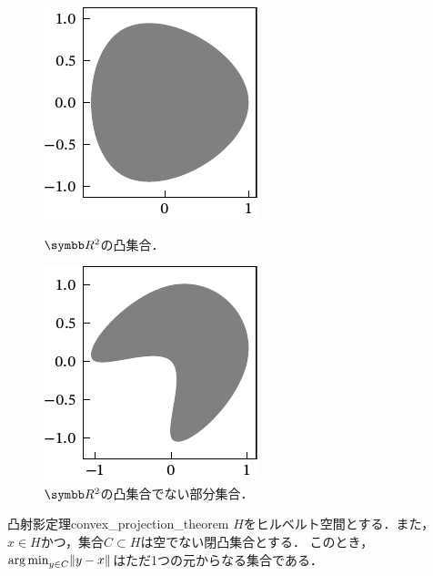 \documentclass[../../main]{subfiles}
\begin{document}
\begin{figure}[htbp]
  \begin{minipage}{0.5\linewidth}
    \centering
    \includegraphics{figures/convex.pdf}
    \caption{\(\numset{R}^2\)の凸集合．}
  \end{minipage}%
  \begin{minipage}{0.5\linewidth}
    \centering
    \includegraphics{figures/non_convex.pdf}
    \caption{\(\numset{R}^2\)の凸集合でない部分集合．}
  \end{minipage}
\end{figure}

\begin{theorem}{凸射影定理}{convex_projection_theorem}
  \(H\)をヒルベルト空間とする．また，\(x\in H\)かつ，集合\(C\subset H\)は空でない閉凸集合とする．
  このとき，\(\operatorname*{arg\,min}_{y\in C}\lVert y-x\rVert\)はただ1つの元からなる集合である．
\end{theorem}
\end{document}

